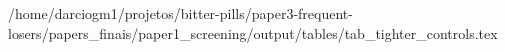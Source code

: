 /home/darciogm1/projetos/bitter-pills/paper3-frequent-losers/papers_finais/paper1_screening/output/tables/tab_tighter_controls.tex